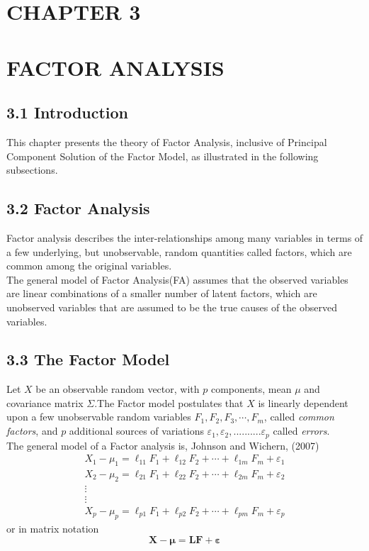 \documentclass[12]{article}
\begin{document}
\section*{CHAPTER 3}
\section*{FACTOR ANALYSIS}
\subsection*{3.1 Introduction}
This chapter presents the theory of Factor Analysis, inclusive of Principal Component Solution of the Factor Model, as illustrated in the following subsections.

\subsection*{3.2 Factor Analysis}
Factor analysis describes the inter-relationships among many variables in terms of a few underlying, but unobservable, random quantities called factors, which are common among the original variables.\\

\noindent The general model of Factor Analysis(FA) assumes that the observed variables are linear combinations of a smaller number of latent factors, which are unobserved variables that are assumed to be the true causes of the observed variables.\\


\subsection*{3.3 The Factor Model}
Let $X$ be an observable random vector, with $p$ components, mean $\mu$ and covariance matrix $\Sigma$.The Factor model postulates that $X$ is linearly dependent upon a few unobservable random variables $F_1, F_2, F_3, \cdots, F_m$, called \emph{common factors}, and $p$ additional sources of variations $\varepsilon_1, \varepsilon_2, ..........\varepsilon_p$ called \emph{errors}.\\
\noindent The general model of a Factor analysis is, Johnson and Wichern, (2007)
\begin{equation}
	\begin{gathered}
		X_1-\mu_1=\ell_{11} F_1+\ell_{12} F_2+\cdots+\ell_{1 m} F_m+\varepsilon_1 \\
		X_2-\mu_2=\ell_{21} F_1+\ell_{22} F_2+\cdots+\ell_{2 m} F_m+\varepsilon_2 \\
		\vdots \\
		\vdots \\
		X_p-\mu_p=\ell_{p 1} F_1+\ell_{p 2} F_2+\cdots+\ell_{p m} F_m+\varepsilon_p
	\end{gathered}
\end{equation}
or in matrix notation
\begin{equation}
	\mathbf{X}- \mathbf{\mu}=\mathbf{L}\mathbf{F}+ \mathbf{\varepsilon}
	\end{equation}
\end{document}
